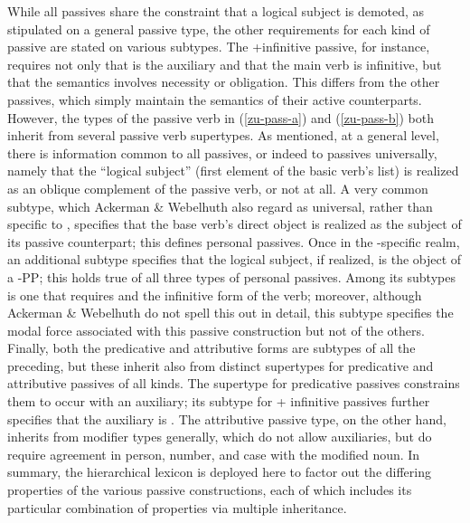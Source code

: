 \documentclass[output=paper
 	        ,biblatex
                ,babelshorthands
                ,newtxmath
                ,draftmode
                ,colorlinks, citecolor=brown
]{langscibook}
\begin{document}
While all passives share the constraint that a logical subject is demoted, as stipulated on a general  passive type, the other requirements for each kind of passive are stated on various subtypes.
The +infinitive passive, for instance, requires not only that  is the auxiliary and that the main verb is infinitive, but that the semantics involves necessity or obligation.
This differs from the other passives, which simply maintain the semantics of their active counterparts.
However, the types of the passive verb  in (\ref{zu-pass-a}) and (\ref{zu-pass-b}) both inherit from several passive verb supertypes.
As mentioned, at a general level, there is information common to all  passives, or indeed to passives universally, namely that the ``logical subject'' (first element of the basic verb's  list) is realized as an oblique complement of the passive verb, or not at all.
A very common subtype, which Ackerman \& Webelhuth also regard as universal, rather than specific to , specifies that the base verb's direct object is realized as the subject of its passive counterpart; this defines personal passives.
Once in the -specific realm, an additional subtype specifies that the logical subject, if realized, is the object of a -PP; this holds true of all three types of  personal passives.
Among its subtypes is one that requires  and the infinitive form of the verb; moreover, although Ackerman \& Webelhuth do not spell this out in detail, this subtype specifies the modal force associated with this passive construction but not of the others.
Finally, both the predicative and attributive forms are subtypes of all the preceding, but these inherit also from distinct supertypes for predicative and attributive passives of all kinds.
The supertype for predicative passives constrains them to occur with an auxiliary; its subtype for  + infinitive passives further specifies that the auxiliary is .
The attributive passive type, on the other hand, inherits from modifier types generally, which do not allow auxiliaries, but do require agreement in person, number, and case with the modified noun.
In summary, the hierarchical lexicon is deployed here to factor out the differing properties of the
various  passive constructions, each of which includes its particular combination of
properties via multiple inheritance.%
%
\end{document}
